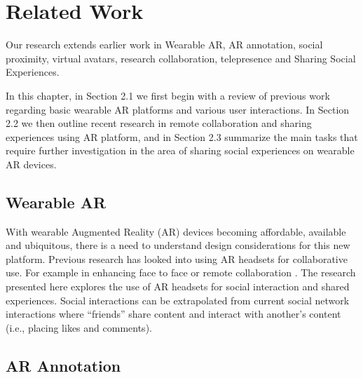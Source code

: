 \chapter{Related Work} %

\label{ch:background} %
Our research extends earlier work in Wearable AR, AR annotation, social proximity, virtual avatars, research collaboration, telepresence and Sharing Social Experiences. 

In this chapter, in Section 2.1 we first begin with a review of previous work regarding basic wearable AR platforms and various user interactions. In Section 2.2 we then outline recent research in remote collaboration and sharing experiences using AR platform, and in Section 2.3 summarize the main tasks that require further investigation in the area of sharing social experiences on wearable AR devices.

\section{Wearable AR}

With wearable Augmented Reality (AR) devices becoming affordable, available and ubiquitous, there is a need to understand design considerations for this new platform. Previous research has looked into using AR headsets for collaborative use. For example in enhancing face to face \cite{Billinghurst2002} or remote collaboration \cite{Gupta2016}. The research presented here explores the use of AR headsets for social interaction and shared experiences. Social interactions can be extrapolated from current social network interactions where \enquote{friends} share content and interact with another's content (i.e., placing likes and comments).


\section{AR Annotation}

